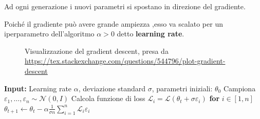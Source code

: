 Ad ogni generazione i nuovi parametri si spostano in direzione del gradiente.

Poiché il gradiente può avere grande ampiezza ,esso va scalato per un iperparametro dell'algoritmo $\alpha > 0$ detto \textbf{learning rate}.

\begin{figure}
\centering
\caption[Visualizzazione del gradient descent, presa da qui]{Visualizzazione del gradient descent, presa da \href{https://tex.stackexchange.com/questions/544796/plot-gradient-descent}{https://tex.stackexchange.com/questions/544796/plot-gradient-descent}}
\label{gradient_descend}
\end{figure}

    
\begin{algorithm}
\caption{OpenAI Algoritmo Evolutivo Genetico}\label{alg:openai_algo}
\begin{algorithmic}[1]
\State \textbf{Input: } Learning rate $\alpha$, deviazione standard $\sigma$, parametri iniziali: $\theta_0$
    \State Campiona $\varepsilon_1, \dots, \varepsilon_n \sim \mathcal{N}(0,I)$
    \State Calcola funzione di loss $\mathcal{L}_i = \mathcal{L}(\theta_t + \sigma \varepsilon_i)$ \textbf{for} $i \in [1,n]$
    \State $\theta_{t+1} \gets \theta_t - \alpha \frac{1}{\sigma n} \sum_{i=1}^n  \mathcal{L}_i \varepsilon_i$
\EndFor
\end{algorithmic}
\end{algorithm}

